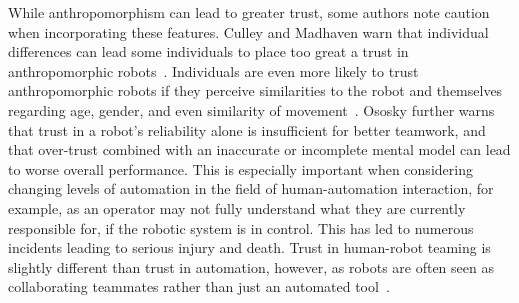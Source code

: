 While anthropomorphism can lead to greater trust, some authors note caution when incorporating these features.
Culley and Madhaven warn that individual differences can lead some individuals to place too great a trust in anthropomorphic robots~\citep{culley_note_2013}.
Individuals are even more likely to trust anthropomorphic robots if they perceive similarities to the robot and themselves regarding age, gender, and even similarity of movement~\citep{pak_multi-level_2014, verberne_trusting_2013}.
Ososky further warns that trust in a robot's reliability alone is insufficient for better teamwork, and that over-trust combined with an inaccurate or incomplete mental model can lead to worse overall performance.
This is especially important when considering changing levels of automation in the field of human-automation interaction, for example, as an operator may not fully understand what they are currently responsible for, if the robotic system is in control.
This has led to numerous incidents leading to serious injury and death.
Trust in human-robot teaming is slightly different than trust in automation, however, as robots are often seen as collaborating teammates rather than just an automated tool~\citep{ososky_building_2013}.

